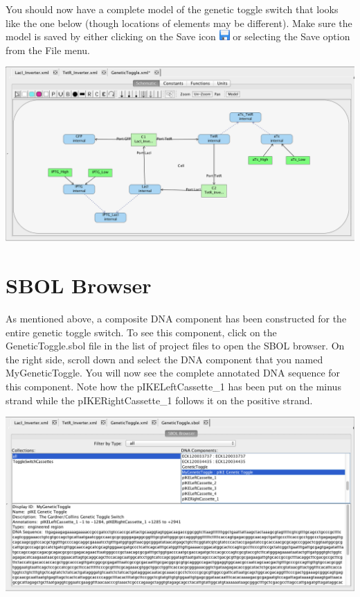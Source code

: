 \documentclass[titlepage,11pt]{article}
\begin{document}
You should now have a complete model of the genetic toggle switch that looks like the one below (though locations of elements may be different).  Make sure the model is saved by either clicking on the Save icon \includegraphics{../gui/icons/save} or selecting the Save option from the File menu.

\begin{center}
\includegraphics[width=160mm]{screenshots/saveGT}
\end{center}

\section{SBOL Browser}

As mentioned above, a composite DNA component has been constructed for the entire genetic toggle switch.  To see this component, click on the GeneticToggle.sbol file in the list of project files to open the SBOL browser.  On the right side, scroll down and select the DNA component that you named MyGeneticToggle.  You will now see the complete annotated DNA sequence for this component.  Note how the pIKELeftCassette\_1 has been put on the minus strand while the pIKERightCassette\_1 follows it on the positive strand.

\begin{center}
\includegraphics[width=160mm]{screenshots/SBOLBrowserGT2}
\end{center}
\end{document}
